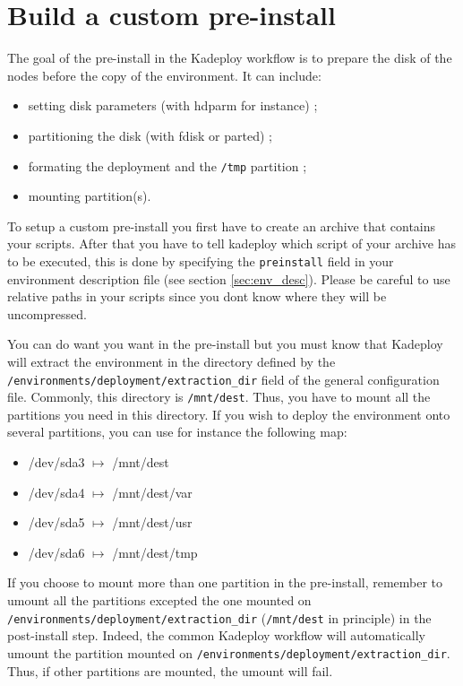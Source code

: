 \documentclass[a4wide,10pt,oneside]{book}
\newcommand{\ypath}[1]{\texttt{#1}}
\begin{document}
\section{Build a custom pre-install}\label{sec:custom-preinstall}
The goal of the pre-install in the Kadeploy workflow is to prepare the disk of the nodes before the copy of the environment. It can include:
\begin{itemize}
\item setting disk parameters (with hdparm for instance) ;
\item partitioning the disk (with fdisk or parted) ;
\item formating the deployment and the \texttt{/tmp} partition ;
\item mounting partition(s).
\end{itemize}

To setup a custom pre-install you first have to create an archive that contains your scripts. After that you have to tell kadeploy which script of your archive has to be executed, this is done by specifying the \texttt{preinstall} field in your environment description file (see section \ref{sec:env_desc}). Please be careful to use relative paths in your scripts since you dont know where they will be uncompressed.

You can do want you want in the pre-install but you must know that Kadeploy will extract the environment in the directory defined by the \ypath{/environments/deployment/extraction\_dir} field of the general configuration file. Commonly, this directory is \texttt{/mnt/dest}. Thus, you have to mount all the partitions you need in this directory. If you wish to deploy the environment onto several partitions, you can use for instance the following map:
\begin{itemize}
\item /dev/sda3 $\mapsto$ /mnt/dest
\item /dev/sda4 $\mapsto$ /mnt/dest/var
\item /dev/sda5 $\mapsto$ /mnt/dest/usr
\item /dev/sda6 $\mapsto$ /mnt/dest/tmp
\end{itemize}

If you choose to mount more than one partition in the pre-install, remember to umount all the partitions excepted the one mounted on \ypath{/environments/deployment/extraction\_dir} (\texttt{/mnt/dest} in principle) in the post-install step. Indeed, the common Kadeploy workflow will automatically umount the partition mounted on \ypath{/environments/deployment/extraction\_dir}. Thus, if other partitions are mounted, the umount will fail.
\end{document}
